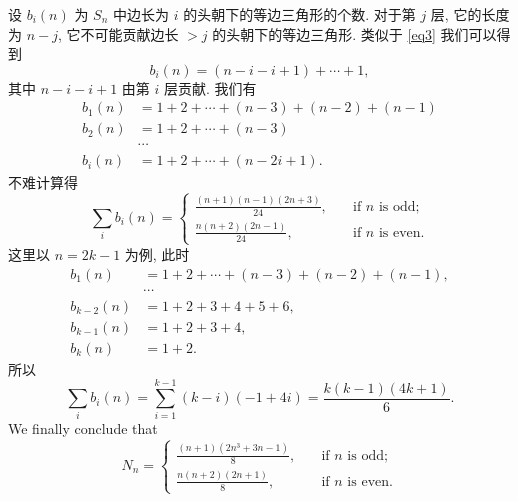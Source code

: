 \begin{soln}
设 $b_i(n)$ 为 $S_n$ 中边长为 $i$ 的头朝下的等边三角形的个数.
对于第 $j$ 层, 它的长度为 $n-j$,
它不可能贡献边长 $> j$ 的头朝下的等边三角形.
类似于 \cref{eq3} 我们可以得到
\begin{equation}
\label{eq4}
b_i(n) = (n-i-i+1) + \cdots + 1,
\end{equation}
其中 $n-i-i+1$ 由第 $i$ 层贡献. 我们有
\begin{align*}
b_1(n) &= 1 + 2 + \cdots + (n-3) + (n-2) + (n-1)\\
b_2(n) &= 1 + 2 + \cdots + (n-3)\\
       &\cdots\\
b_i(n) &= 1 + 2 + \cdots + (n-2i+1).
\end{align*}
不难计算得
\begin{equation}
\label{eq5}
\sum_i b_i(n) = \begin{cases}
\frac{(n+1)(n-1)(2n+3)}{24}, \quad &\text{if $n$ is odd};\\
\frac{n(n+2)(2n-1)}{24}, \quad &\text{if $n$ is even}.
\end{cases}
\end{equation}
这里以 $n = 2k-1$ 为例, 此时
\begin{align*}
b_1(n)     &= 1 + 2 + \cdots + (n-3) + (n-2) + (n-1),\\
           &\cdots\\
b_{k-2}(n) &= 1 + 2 + 3 + 4 + 5 + 6,\\
b_{k-1}(n) &= 1 + 2 + 3 + 4,\\
b_{k}(n)   &= 1 + 2.
\end{align*}
所以
\[
\sum_i b_i(n) = \sum_{i=1}^{k-1}(k-i)(-1+4i)=\frac{k(k-1)(4k+1)}{6}.
\]
We finally conclude that
\[
\boxed{N_n = \begin{cases}
\frac{(n+1)(2n^3 + 3n - 1)}{8}, \quad &\text{if $n$ is odd};\\
\frac{n(n+2)(2n+1)}{8},         \quad &\text{if $n$ is even}.
\end{cases}}
\]
\end{soln}
